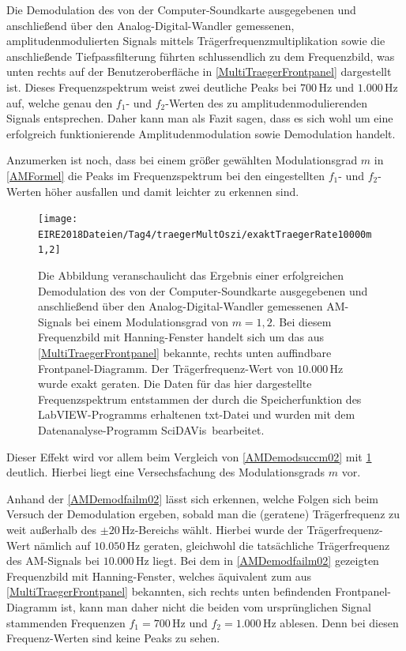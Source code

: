\documentclass[
a4paper,
12pt,
pagesize,
ngerman
]{scrartcl}
\begin{document}
	\noindent Die Demodulation des von der Computer-Soundkarte ausgegebenen und anschließend über den Analog-Digital-Wandler gemessenen, amplitudenmodulierten Signals mittels Trägerfrequenzmultiplikation sowie die anschließende Tiefpassfilterung führten schlussendlich zu dem Frequenzbild, was unten rechts auf der Benutzeroberfläche in \cref{MultiTraegerFrontpanel} dargestellt ist.
	Dieses Frequenzspektrum weist zwei deutliche Peaks bei $700\,$Hz und $1.000\,$Hz auf, welche genau den $f_1$- und $f_2$-Werten des zu amplitudenmodulierenden Signals entsprechen. 
	Daher kann man als Fazit sagen, dass es sich wohl um eine erfolgreich funktionierende Amplitudenmodulation sowie Demodulation handelt. 
	
	Anzumerken ist noch, dass bei einem größer gewählten Modulationsgrad $m$ in \cref{AMFormel} die Peaks im Frequenzspektrum bei den eingestellten $f_1$- und $f_2$-Werten höher ausfallen und damit leichter zu erkennen sind. 
	
	\begin{figure}[H]
		\centering
		\texttt{[image: EIRE2018Dateien/Tag4/traegerMultOszi/exaktTraegerRate10000m1,2]}
		\caption{Die Abbildung veranschaulicht das Ergebnis einer erfolgreichen Demodulation des von der Computer-Soundkarte ausgegebenen und anschließend über den Analog-Digital-Wandler gemessenen AM-Signals bei einem Modulationsgrad von $m = 1,2$. Bei diesem Frequenzbild mit Hanning-Fenster handelt sich um das aus \cref{MultiTraegerFrontpanel} bekannte, rechts unten auffindbare Frontpanel-Diagramm. Der Trägerfrequenz-Wert von $10.000\,$Hz wurde exakt geraten. Die Daten für das hier dargestellte Frequenzspektrum entstammen der durch die Speicherfunktion des LabVIEW-Programms erhaltenen txt-Datei und wurden mit dem Datenanalyse-Programm \glqq SciDAVis\grqq\ bearbeitet.}
		\label{AMDemodsuccm12}
	\end{figure}

	\noindent Dieser Effekt wird vor allem beim Vergleich von \cref{AMDemodsuccm02} mit \cref{AMDemodsuccm12} deutlich. 
	Hierbei liegt eine Versechsfachung des Modulationsgrads $m$ vor.
	
	Anhand der \cref{AMDemodfailm02} lässt sich erkennen, welche Folgen sich beim Versuch der Demodulation ergeben, sobald man die (geratene) Trägerfrequenz zu weit außerhalb des $\pm 20\,$Hz-Bereichs wählt.
	Hierbei wurde der Trägerfrequenz-Wert nämlich auf $10.050\,$Hz geraten, gleichwohl die tatsächliche Trägerfrequenz des AM-Signals bei $10.000\,$Hz liegt.
	Bei dem in \cref{AMDemodfailm02} gezeigten Frequenzbild mit Hanning-Fenster, welches äquivalent zum aus \cref{MultiTraegerFrontpanel} bekannten, sich rechts unten befindenden Frontpanel-Diagramm ist, kann man daher nicht die beiden vom ursprünglichen Signal stammenden Frequenzen $f_1 = 700\,$Hz und $f_2 = 1.000\,$Hz ablesen.
	Denn bei diesen Frequenz-Werten sind keine Peaks zu sehen.
	
\end{document}
